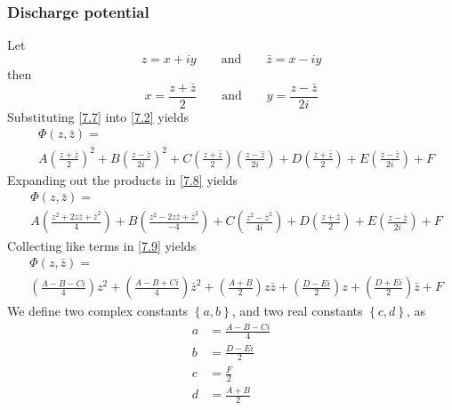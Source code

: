 \documentclass[12pt]{article}
\begin{document}
\subsubsection{Discharge potential}
Let
%
\begin{equation}\label{7.6}
    z = x + iy
    \qquad\text{and}\qquad
    \bar{z} = x - iy
\end{equation}
%
then
%
\begin{equation}\label{7.7}
    x = \frac{z + \bar{z}}{2}
    \qquad\text{and}\qquad
    y = \frac{z - \bar{z}}{2i}
\end{equation}
%
Substituting \eqref{7.7} into \eqref{7.2} yields
%
\begin{equation}\label{7.8}
    \begin{split}&\Phi(z,\bar{z}) = \\
    &
    A\left(\frac{z+\bar{z}}{2}\right)^2 + B\left(\frac{z-\bar{z}}{2i}\right)^2 +
    C\left(\frac{z+\bar{z}}{2}\right)\left(\frac{z-\bar{z}}{2i}\right) +
    D\left(\frac{z+\bar{z}}{2}\right) + E\left(\frac{z-\bar{z}}{2i}\right) + F
    \end{split}
\end{equation}
%
Expanding out the products in \eqref{7.8} yields
%
\begin{equation}\label{7.9}
    \begin{split}&\Phi(z,\bar{z}) = \\
    &
    A\left(\frac{z^2+2z\bar{z}+\bar{z}^2}{4}\right) + B\left(\frac{z^2-2z\bar{z}+\bar{z}^2}{-4}\right) +
    C\left(\frac{z^2-\bar{z}^2}{4i}\right) +
    D\left(\frac{z+\bar{z}}{2}\right) + E\left(\frac{z-\bar{z}}{2i}\right) + F
    \end{split}
\end{equation}
%
Collecting like terms in \eqref{7.9} yields
%
\begin{equation}\label{7.10}
    \begin{split}&\Phi(z,\bar{z}) = \\
    &
    \left(\frac{A-B-Ci}{4}\right) z^2 +
    \left(\frac{A-B+Ci}{4}\right) \bar{z}^2 +
    \left(\frac{A+B}{2}\right) z\bar{z} +
    \left(\frac{D-Ei}{2}\right) z +
    \left(\frac{D+Ei}{2}\right) \bar{z} +
    F
    \end{split}
\end{equation}
%
We define two complex constants $\left\{ a, b \right\}$, and two real constants $\left\{ c, d \right\}$, as
%
\begin{align}
    a &= \frac{A-B-Ci}{4} \label{7.11}\\
    b &= \frac{D-Ei}{2} \label{7.12}\\
    c &= \frac{F}{2} \label{7.13}\\
    d &= \frac{A+B}{2} \label{7.14}
\end{align}
\end{document}
